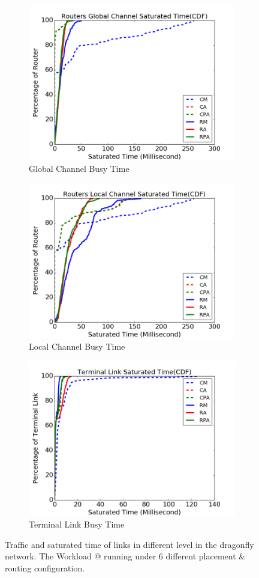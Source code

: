 \documentclass[conference,compsoc]{IEEEtran}
\makeatletter
\newcommand{\Rmnum}[1]{\expandafter\@slowromancap\romannumeral #1@}
\makeatother
\begin{document}
\begin{figure}[t!]
    \centering   
    \begin{subfigure}[t]{0.32\textwidth}
        \centering
        \includegraphics[height=1.8 in]{wkld/gc-stime}
        \caption{Global Channel Busy Time}
        \label{fig:global-channel-stime}
    \end{subfigure}\hfill
     \hspace{1em}%
    \begin{subfigure}[t]{0.32\textwidth}
        \centering
        \includegraphics[height=1.8 in]{wkld/lc-stime}
        \caption{Local Channel Busy Time}
        \label{fig:local-channel-stime}
    \end{subfigure}\hfill
    \hspace{1em}%
    \begin{subfigure}[t]{0.32\textwidth}
        \centering
        \includegraphics[height=1.8 in]{wkld/tl-stime}
        \caption{Terminal Link Busy Time}
        \label{fig:terminal-link-stime}
    \end{subfigure}%
   \caption{Traffic and saturated time of links in different level in the dragonfly network. The Workload \Rmnum{1} running under 6 different placement \& routing configuration.}
   \label{fig:wkld-network-traffic-stime}
\end{figure}
\end{document}
